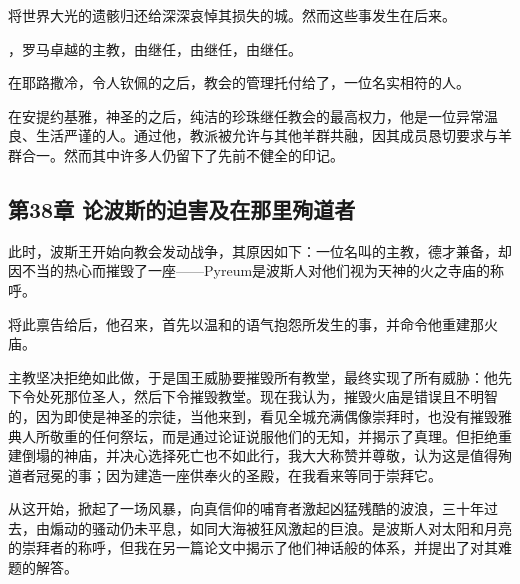 将世界大光的遗骸归还给深深哀悼其损失的城。然而这些事发生在后来。\par

，罗马卓越的主教，由继任，由继任，由继任。\par

在耶路撒冷，令人钦佩的之后，教会的管理托付给了，一位名实相符的人。\par

在安提约基雅，神圣的之后，纯洁的珍珠继任教会的最高权力，他是一位异常温良、生活严谨的人。通过他，教派被允许与其他羊群共融，因其成员恳切要求与羊群合一。然而其中许多人仍留下了先前不健全的印记。\par


\subsection{第38章 论波斯的迫害及在那里殉道者}

此时，波斯王开始向教会发动战争，其原因如下：一位名叫的主教，德才兼备，却因不当的热心而摧毁了一座——Pyreum是波斯人对他们视为天神的火之寺庙的称呼。\par

将此禀告给后，他召来，首先以温和的语气抱怨所发生的事，并命令他重建那火庙。\par

主教坚决拒绝如此做，于是国王威胁要摧毁所有教堂，最终实现了所有威胁：他先下令处死那位圣人，然后下令摧毁教堂。现在我认为，摧毁火庙是错误且不明智的，因为即使是神圣的宗徒，当他来到，看见全城充满偶像崇拜时，也没有摧毁雅典人所敬重的任何祭坛，而是通过论证说服他们的无知，并揭示了真理。但拒绝重建倒塌的神庙，并决心选择死亡也不如此行，我大大称赞并尊敬，认为这是值得殉道者冠冕的事；因为建造一座供奉火的圣殿，在我看来等同于崇拜它。\par

从这开始，掀起了一场风暴，向真信仰的哺育者激起凶猛残酷的波浪，三十年过去，由煽动的骚动仍未平息，如同大海被狂风激起的巨浪。是波斯人对太阳和月亮的崇拜者的称呼，但我在另一篇论文中揭示了他们神话般的体系，并提出了对其难题的解答。\par

